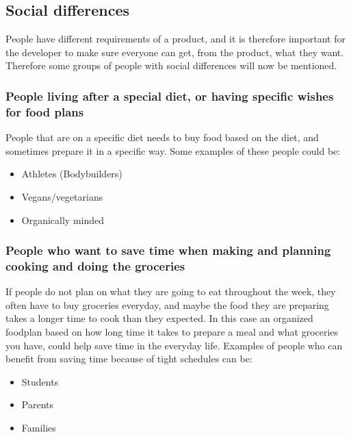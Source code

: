 \subsection{Social differences}

People have different requirements of a product, and it is therefore important for the developer to make sure everyone can get, from the product, what they want. Therefore some groups of people with social differences will now be mentioned.

\subsubsection{People living after a special diet, or having specific wishes for food plans}
People that are on a specific diet needs to buy food based on the diet, and sometimes prepare it in a specific way.
Some examples of these people could be:
\begin{itemize}
\item Athletes (Bodybuilders)
\item Vegans/vegetarians
\item Organically minded
\end{itemize}

\subsubsection{People who want to save time when making and planning cooking and doing the groceries} 
If people do not plan on what they are going to eat throughout the week, they often have to buy groceries everyday, and maybe the food they are preparing takes a longer time to cook than they expected. In this case an organized foodplan based on how long time it takes to prepare a meal and what groceries you have, could help save time in the everyday life. Examples of people who can benefit from saving time because of tight schedules can be:
\begin{itemize}
\item Students
\item Parents
\item Families
\end{itemize}

